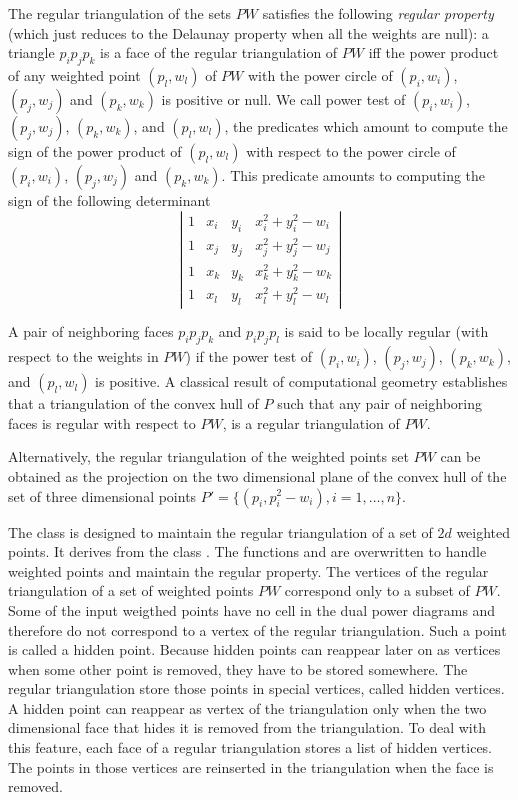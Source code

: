 The regular triangulation of the sets ${  PW}$
satisfies the following {\em regular property} (which just reduces to the 
Delaunay property when all the weights are null):
a triangle $p_ip_jp_k$ is a face of the regular triangulation
of ${  PW}$ iff the power product of any weighted point
 $(p_l, w_l)$ of ${  PW}$ with the power circle of
 $(p_i, w_i)$, $(p_j, w_j)$ and $(p_k, w_k)$ is positive or null.
We call  power test of  $(p_i, w_i)$, $(p_j, w_j)$, $(p_k, w_k)$,
and $(p_l, w_l)$,  the predicates which amount to compute
the sign of 
the power product of $(p_l, w_l)$ with respect to
the power circle of
 $(p_i, w_i)$, $(p_j, w_j)$ and $(p_k, w_k)$.
This predicate amounts to computing the sign of
the following
determinant
\[\left| \begin{array}{cccc}
1  &  x_i  &  y_i  &  x_i ^2 + y_i ^2 - w_i  \\
1  &  x_j  &  y_j  &  x_j ^2 + y_j ^2 - w_j  \\
1  &  x_k  &  y_k  &  x_k ^2 + y_k ^2 - w_k  \\
1  &  x_l  &  y_l  &  x_l ^2 + y_l ^2 - w_l
\end{array}
\right|
\]

A pair of neighboring faces $p_ip_jp_k$
and $p_ip_jp_l$ is said to be locally regular
(with respect to  the weights in ${  PW}$)
if the power test of $(p_i, w_i)$, $(p_j, w_j)$, $(p_k, w_k)$,
and $(p_l, w_l)$ is positive.
A classical  result of computational geometry
establishes that a triangulation of the convex hull of ${  P}$
such that any pair of neighboring faces is regular with respect
to ${  PW}$, is a
 regular triangulation of ${  PW}$.

Alternatively, the regular triangulation
of the weighted points set ${  PW}$
can be obtained as the projection
on the two dimensional plane of the convex hull of the set of three
dimensional points 
${  P'}= \{ (p_i,p_i ^2 - w_i ), i = 1, \ldots , n \}$.

The class 
 is designed to maintain the
regular triangulation of a set of $2d$ weighted points.
It derives from the class .
The functions  and 
 are overwritten to handle weighted points
and maintain the regular
property.
The vertices of the regular triangulation
of a set of weighted points ${PW}$ correspond  only to a subset
of ${PW}$.
Some of the input
weigthed points have no cell in the dual power diagrams
and therefore do not correspond to a vertex of the regular
triangulation.
Such a point is called a hidden point.
Because hidden points can reappear later on as vertices
when  some other point is removed,
they  have to be stored somewhere. 
The regular triangulation  store those points in special vertices, called
hidden vertices. 
A hidden point can reappear as vertex of the triangulation
only when the two dimensional face that hides it
is removed from the triangulation. To deal with this feature,
each face of a regular triangulation stores a list of hidden vertices.
The points in those vertices 
are reinserted in the triangulation  when the face
is removed.

